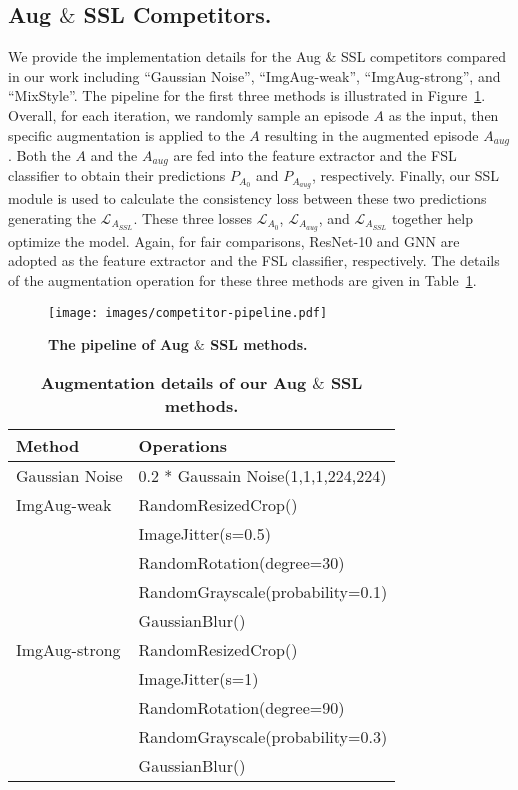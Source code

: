 \documentclass{article}
\begin{document}
\subsection{Aug $\&$ SSL Competitors.}
We provide the implementation details for the Aug $\&$ SSL competitors compared in our work including ``Gaussian Noise'', ``ImgAug-weak'', ``ImgAug-strong'', and ``MixStyle''. The pipeline for the first three methods is illustrated in Figure~\ref{fig:pipeline}. Overall, for each iteration, we randomly sample an episode $A$ as the input, then specific augmentation is applied to the $A$ resulting in the augmented episode $A_{aug}$. Both the $A$ and the $A_{aug}$ are fed into the feature extractor and the FSL classifier to obtain their predictions $P_{A_{0}}$ and $P_{A_{aug}}$, respectively. Finally, our SSL module is used to calculate the consistency loss between these two predictions generating the $\mathcal{L}_{A_{SSL}}$. These three losses $\mathcal{L}_{A_{0}}$, $\mathcal{L}_{A_{aug}}$, and $\mathcal{L}_{A_{SSL}}$ together help optimize the model. Again, for fair comparisons, ResNet-10 and GNN are adopted as the feature extractor and the FSL classifier, respectively. The details of the augmentation operation for these three methods are given in Table~\ref{aug}.

\begin{figure}[h!]
	\centering
\texttt{[image: images/competitor-pipeline.pdf]}
\caption{\textbf{The pipeline of Aug $\&$ SSL methods.} }
	\label{fig:pipeline} 
\end{figure}


\begin{table}[h] 
\begin{center}
\begin{tabular}{ll}
\toprule
\textbf{Method} & \textbf{Operations}  \\ \hline
Gaussian Noise               
& 0.2 * Gaussain Noise(1,1,1,224,224)  \\ \hline

ImgAug-weak                
& RandomResizedCrop()                 \\
\multirow{4}{*}{}            
& ImageJitter(s=0.5)                  \\
& RandomRotation(degree=30)           \\
& RandomGrayscale(probability=0.1)    \\
& GaussianBlur()    \\ 
\hline

ImgAug-strong                
& RandomResizedCrop()                 \\
\multirow{4}{*}{}            
& ImageJitter(s=1)                  \\
& RandomRotation(degree=90)           \\
& RandomGrayscale(probability=0.3)    \\
& GaussianBlur()    \\ 
\bottomrule           
\end{tabular}
\end{center}
\caption{\textbf{Augmentation details of our Aug $\&$ SSL methods.}}
\label{aug}
\end{table}
\end{document}
